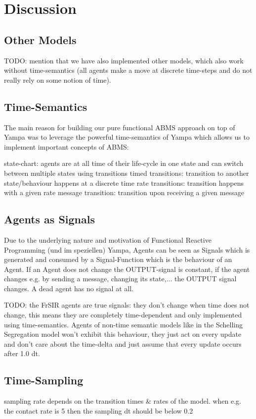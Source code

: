 \section{Discussion}

\subsection{Other Models}
TODO: mention that we have also implemented other models, which also work without time-semantics (all agents make a move at discrete time-steps and do not really rely on some notion of time). 

\subsection{Time-Semantics}
The main reason for building our pure functional ABMS approach on top of Yampa was to leverage the powerful time-semantics of Yampa which allows us to implement important concepts of ABMS:

state-chart: agents are at all time of their life-cycle in one state and can switch between multiple states using transitions 
timed transitions: transition to another state/behaviour happens at a discrete time
rate transitions: transition happens with a given rate
message transition: transition upon receiving a given message 

\subsection{Agents as Signals}
Due to the underlying nature and motivation of Functional Reactive Programming (und im speziellen) Yampa, Agents can be seen as Signals which is generated and consumed by a Signal-Function which is the behaviour of an Agent. If an Agent does not change the OUTPUT-signal is constant, if the agent changes e.g. by sending a message, changing its state,... the OUTPUT signal changes. A dead agent has no signal at all.

TODO: the FrSIR agents are true signals: they don't change when time does not change, this means they are completely time-dependent and only implemented using time-semantics. Agents of non-time semantic models like in the Schelling Segregation model won't exhibit this behaviour, they just act on every update and don't care about the time-delta and just assume that every update occurs after 1.0 dt.

\subsection{Time-Sampling}
sampling rate depends on the transition times \& rates of the model. when e.g. the contact rate is 5 then the sampling dt should be below 0.2

